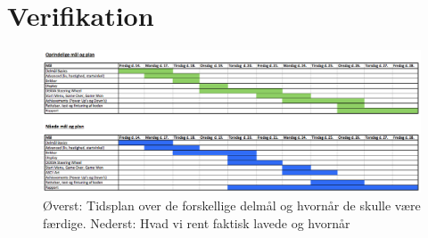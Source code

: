 \chapter{Verifikation}

\begin{figure}[h!]
\centering
\includegraphics[scale=0.4]{figs/Tidsplan2.png}
\caption{Øverst: Tidsplan over de forskellige delmål og hvornår de skulle være færdige. Nederst: Hvad vi rent faktisk lavede og hvornår}
\label{fig:tidsplan2}
\end{figure}